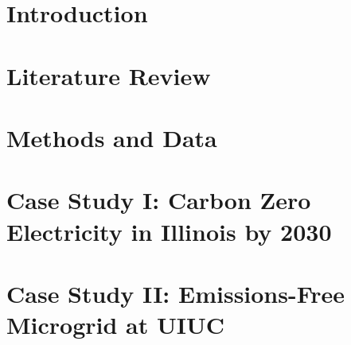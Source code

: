 \documentclass[edeposit,fullpage,11pt]{uiucthesis2018}
\begin{document}
%
%
\tableofcontents
\listoftables
\listoffigures
%

%
\pagebreak
\mainmatter
%

\glsresetall
\chapter{Introduction}

%
\chapter{Literature Review}

\label{chapter:litrev}

\chapter{Methods and Data}
\label{chapter:methods}


\chapter{Case Study I: Carbon Zero Electricity in Illinois by 2030}
\label{chapter:illinois}


 \chapter{Case Study II: Emissions-Free Microgrid at UIUC}
\label{chapter:uiuc}

\end{document}
